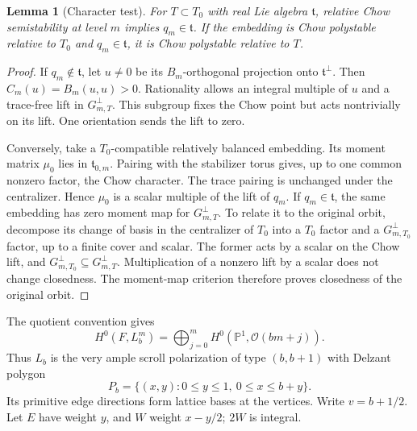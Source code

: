 \documentclass[12pt]{amsart}
\newtheorem{lem}[thm]{Lemma}
\theoremstyle{definition}
\theoremstyle{remark}
\numberwithin{equation}{section}
\newcommand{\cO}{\mathcal{O}}
\newcommand{\mP}{\mathbb{P}}
\begin{document}
\begin{lem}[Character test]\label{en-test}
For $T\subset T_0$ with real Lie algebra $\mathfrak t$, relative Chow semistability at level $m$ implies $q_m\in\mathfrak t$. If the embedding is Chow polystable relative to $T_0$ and $q_m\in\mathfrak t$, it is Chow polystable relative to $T$.
\end{lem}
\begin{proof}
If $q_m\notin\mathfrak t$, let $u\neq0$ be its $B_m$-orthogonal projection onto $\mathfrak t^\perp$. Then $C_m(u)=B_m(u,u)>0$. Rationality allows an integral multiple of $u$ and a trace-free lift in $G_{m,T}^{\perp}$. This subgroup fixes the Chow point but acts nontrivially on its lift. One orientation sends the lift to zero.

Conversely, take a $T_0$-compatible relatively balanced embedding. Its moment matrix $\mu_0$ lies in $\mathfrak t_{0,m}$. Pairing with the stabilizer torus gives, up to one common nonzero factor, the Chow character. The trace pairing is unchanged under the centralizer. Hence $\mu_0$ is a scalar multiple of the lift of $q_m$. If $q_m\in\mathfrak t$, the same embedding has zero moment map for $G_{m,T}^{\perp}$. To relate it to the original orbit, decompose its change of basis in the centralizer of $T_0$ into a $T_0$ factor and a $G_{m,T_0}^{\perp}$ factor, up to a finite cover and scalar. The former acts by a scalar on the Chow lift, and $G_{m,T_0}^{\perp}\subseteq G_{m,T}^{\perp}$. Multiplication of a nonzero lift by a scalar does not change closedness. The moment-map criterion therefore proves closedness of the original orbit.
\end{proof}

The quotient convention gives
\[
H^0(F,L_b^m)=\bigoplus_{j=0}^mH^0(\mP^1,\cO(bm+j)).
\]
Thus $L_b$ is the very ample scroll polarization of type $(b,b+1)$ with Delzant polygon
\begin{equation}\label{en-poly}
P_b=\{(x,y):0\leq y\leq1,\ 0\leq x\leq b+y\}.
\end{equation}
Its primitive edge directions form lattice bases at the vertices. Write $v=b+1/2$. Let $E$ have weight $y$, and $W$ weight $x-y/2$; $2W$ is integral.
\end{document}
